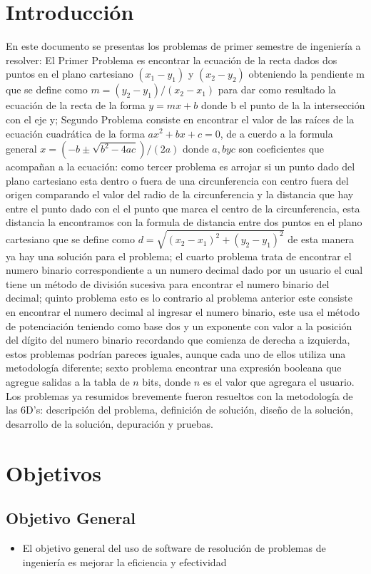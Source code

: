 \documentclass[conference]{IEEEtran}
\begin{document}
\section{Introducción}
En este documento se presentas los problemas de primer semestre de ingeniería a resolver: El Primer Problema es encontrar la ecuación de la recta dados dos puntos en el plano cartesiano $ (x_1 - y_1) $ y $ (x_2 - y_2) $ obteniendo la pendiente m que se define como $ m = (y_2 - y_1)/ (x_2 - x_1) $  para dar como resultado la ecuación de la recta de la forma $ y = m x 
+ b $ donde b el punto de la la intersección con el eje y; Segundo Problema consiste en encontrar el valor de las raíces de la ecuación cuadrática de la forma $ ax^2 +bx + c = 0 $, de a cuerdo a la formula general $ x = (-b\pm \sqrt{b^2-4ac})/(2a)$  donde $ a, b y c $ son coeficientes que acompañan a la ecuación: como tercer problema es arrojar si un punto dado del plano cartesiano esta dentro o fuera de una circunferencia con centro fuera del origen comparando el valor del radio de la circunferencia y la distancia que hay entre el punto dado con el el punto que marca el centro de la circunferencia, esta distancia la encontramos con la formula de distancia entre dos puntos en el plano cartesiano que se define como  $d=\sqrt{(x_2-x_1)^2+(y_2-y_1)^2} $ de esta manera ya hay una solución para el problema; el cuarto problema trata de encontrar el numero binario correspondiente a un numero decimal dado por un usuario el cual tiene un método de división sucesiva para encontrar el numero binario del decimal; quinto problema esto es lo contrario al problema anterior este consiste en encontrar el numero decimal al ingresar el numero binario, este usa el método de potenciación teniendo como base dos y un exponente con valor a la posición del dígito del numero binario recordando que comienza de derecha a izquierda, estos problemas podrían pareces iguales, aunque cada uno de ellos utiliza una metodología diferente; sexto problema encontrar una expresión booleana que agregue salidas a la tabla de $n$ bits, donde $n$ es el valor que agregara el usuario.\\ 
Los problemas ya resumidos brevemente fueron resueltos con la metodología de las 6D's: descripción del problema, definición de solución, diseño de la solución, desarrollo de la solución, depuración y pruebas.

\section{Objetivos}
\subsection{Objetivo General}
\begin{itemize}
    \item El objetivo general del uso de software de resolución de problemas de ingeniería es mejorar la eficiencia y efectividad 
\end{itemize}
\end{document}
